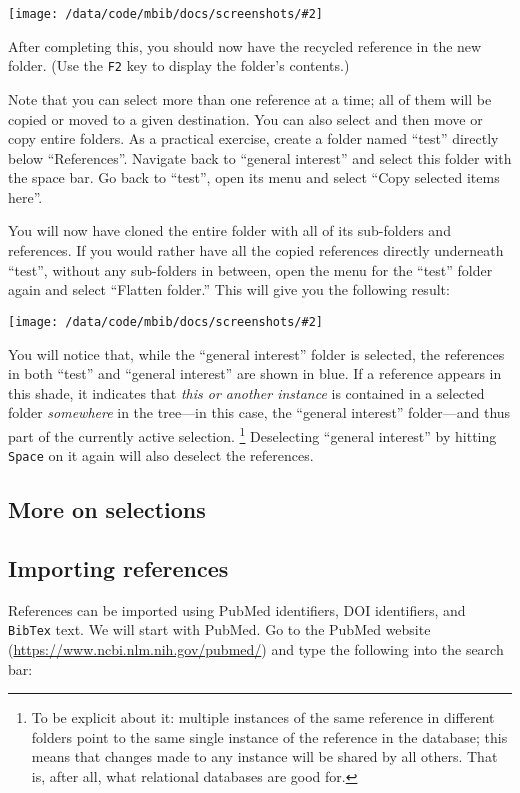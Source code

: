 \documentclass[10pt]{article}
\newcommand*{\bibtex}{\texttt{BibTex}\xspace}
\newcommand*{\key}[1]{\texttt{#1}\xspace}
\newcommand{\screenshot}[2][]{%
\medskip\par
\begin{center}
\texttt{[image: /data/code/mbib/docs/screenshots/\#2]}
\end{center}}
\begin{document}
\screenshot{move-here}

\noindent After completing this, you should now have the recycled reference in the new folder. (Use the \key{F2} key to display the folder's contents.)

Note that you can select more than one reference at a time; all of them will be copied or moved to a given destination. You can also select and then move or copy entire folders. As a practical exercise, create a folder named ``test'' directly below ``References''. Navigate back to ``general interest'' and select this folder with the space bar. Go back to ``test'', open its menu and select ``Copy selected items here''. 

You will now have cloned the entire folder with all of its sub-folders and references. If you would rather have all the copied references directly underneath ``test'', without any sub-folders in between, open the menu for the ``test'' folder again and select ``Flatten folder.'' This will give you the following result:

\screenshot{flatten-folder}

\noindent You will notice that, while the ``general interest'' folder is selected, the references in both ``test'' and ``general interest'' are shown in blue. If a reference appears in this shade, it indicates that \emph{this or another instance} is contained in a selected folder \emph{somewhere} in the tree---in this case, the ``general interest'' folder---and thus part of the currently active selection.%
%
\footnote{To be explicit about it: multiple instances of the same reference in different folders point to the same single instance of the reference in the database; this means that changes made to any instance will be shared by all others. That is, after all, what relational databases are good for.}
%
Deselecting ``general interest'' by hitting \key{Space} on it again will also deselect the references. 

\subsection{More on selections}




\subsection{Importing references}

References can be imported using PubMed identifiers, DOI identifiers, and \bibtex text. We will start with PubMed. Go to the PubMed website (\url{https://www.ncbi.nlm.nih.gov/pubmed/}) and type the following into the search bar:
\end{document}
